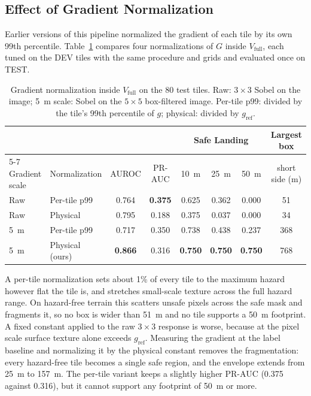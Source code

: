 \documentclass{article}
\begin{document}
\subsection{Effect of Gradient Normalization}
\label{sec:norm}
Earlier versions of this pipeline normalized the gradient of each tile by its own 99th percentile. Table~\ref{tab:norm} compares four normalizations of $G$ inside $V_{\text{full}}$, each tuned on the DEV tiles with the same procedure and grids and evaluated once on TEST.

\begin{table}[!htb]
  \caption{Gradient normalization inside $V_{\text{full}}$ on the 80 test tiles. Raw: $3 \times 3$ Sobel on the image; 5~m scale: Sobel on the $5 \times 5$ box-filtered image. Per-tile p99: divided by the tile's 99th percentile of $g$; physical: divided by $g_{\text{ref}}$.}
  \label{tab:norm}
  \centering
  \small
  \setlength{\tabcolsep}{4pt}
  \begin{tabular}{llcccccc}
    \toprule
    & & & & \multicolumn{3}{c}{Safe Landing} & Largest box \\
    \cmidrule(lr){5-7}
    Gradient scale & Normalization & AUROC & PR-AUC & 10~m & 25~m & 50~m & short side (m) \\
    \midrule
    Raw & Per-tile p99 & 0.764 & \textbf{0.375} & 0.625 & 0.362 & 0.000 & 51 \\
    Raw & Physical & 0.795 & 0.188 & 0.375 & 0.037 & 0.000 & 34 \\
    5~m & Per-tile p99 & 0.717 & 0.350 & 0.738 & 0.438 & 0.237 & 368 \\
    5~m & Physical (ours) & \textbf{0.866} & 0.316 & \textbf{0.750} & \textbf{0.750} & \textbf{0.750} & 768 \\
    \bottomrule
  \end{tabular}
\end{table}

A per-tile normalization sets about 1\% of every tile to the maximum hazard however flat the tile is, and stretches small-scale texture across the full hazard range. On hazard-free terrain this scatters unsafe pixels across the safe mask and fragments it, so no box is wider than 51~m and no tile supports a 50~m footprint. A fixed constant applied to the raw $3 \times 3$ response is worse, because at the pixel scale surface texture alone exceeds $g_{\text{ref}}$. Measuring the gradient at the label baseline and normalizing it by the physical constant removes the fragmentation: every hazard-free tile becomes a single safe region, and the envelope extends from 25~m to 157~m. The per-tile variant keeps a slightly higher PR-AUC (0.375 against 0.316), but it cannot support any footprint of 50~m or more.
\end{document}
